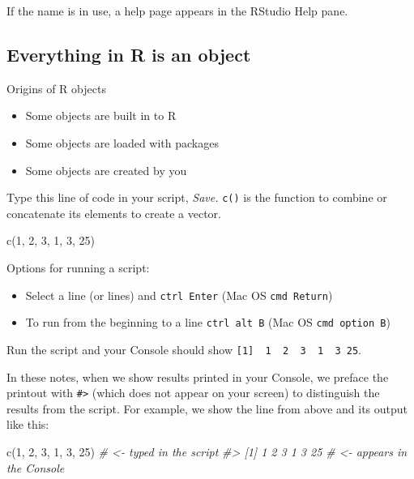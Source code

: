 \documentclass[
]{book}
\newenvironment{Shaded}{\begin{snugshade}}{\end{snugshade}}
\newcommand{\CommentTok}[1]{\textcolor[rgb]{0.56,0.35,0.01}{\textit{#1}}}
\newcommand{\DecValTok}[1]{\textcolor[rgb]{0.00,0.00,0.81}{#1}}
\newcommand{\FunctionTok}[1]{\textcolor[rgb]{0.00,0.00,0.00}{#1}}
\newcommand{\NormalTok}[1]{#1}
\providecommand{\tightlist}{%
  \setlength{\itemsep}{0pt}\setlength{\parskip}{0pt}}
\begin{document}
If the name is in use, a help page appears in the RStudio Help pane.

\hypertarget{everything-in-r-is-an-object}{%
\subsection{Everything in R is an object}\label{everything-in-r-is-an-object}}

Origins of R objects

\begin{itemize}
\tightlist
\item
  Some objects are built in to R
\item
  Some objects are loaded with packages
\item
  Some objects are created by you
\end{itemize}

Type this line of code in your script, \emph{Save.} \texttt{c()} is the function to combine or concatenate its elements to create a vector.

\begin{Shaded}
\begin{Highlighting}[]
\FunctionTok{c}\NormalTok{(}\DecValTok{1}\NormalTok{, }\DecValTok{2}\NormalTok{, }\DecValTok{3}\NormalTok{, }\DecValTok{1}\NormalTok{, }\DecValTok{3}\NormalTok{, }\DecValTok{25}\NormalTok{)}
\end{Highlighting}
\end{Shaded}

Options for running a script:

\begin{itemize}
\tightlist
\item
  Select a line (or lines) and \texttt{ctrl\ Enter} (Mac OS \texttt{cmd\ Return})
\item
  To run from the beginning to a line \texttt{ctrl\ alt\ B} (Mac OS \texttt{cmd\ option\ B})
\end{itemize}

Run the script and your Console should show \texttt{{[}1{]}\ \ 1\ \ 2\ \ 3\ \ 1\ \ 3\ 25}.

In these notes, when we show results printed in your Console, we preface the printout with \texttt{\#\textgreater{}} (which does not appear on your screen) to distinguish the results from the script. For example, we show the line from above and its output like this:

\begin{Shaded}
\begin{Highlighting}[]
\FunctionTok{c}\NormalTok{(}\DecValTok{1}\NormalTok{, }\DecValTok{2}\NormalTok{, }\DecValTok{3}\NormalTok{, }\DecValTok{1}\NormalTok{, }\DecValTok{3}\NormalTok{, }\DecValTok{25}\NormalTok{)          }\CommentTok{\# \textless{}{-} typed in the script}
\CommentTok{\#\textgreater{} [1]  1  2  3  1  3 25      \# \textless{}{-} appears in the Console}
\end{Highlighting}
\end{Shaded}
\end{document}
